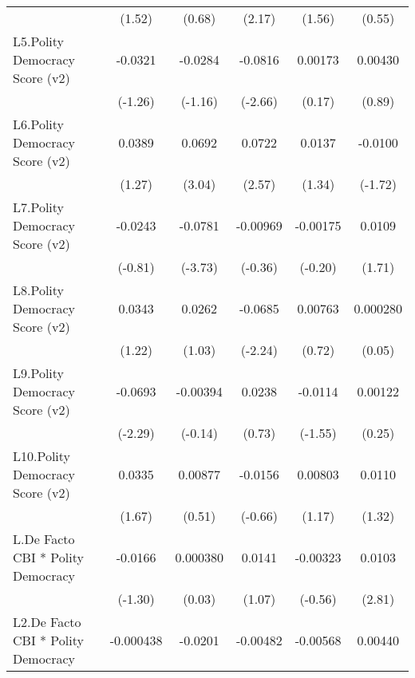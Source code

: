 {\begin{longtable}{l*{5}{c}}
                &   (1.52)         &   (0.68)         &   (2.17)         &   (1.56)         &   (0.55)         \\
[1em]
L5.Polity Democracy Score (v2)&  -0.0321         &  -0.0284         &  -0.0816\sym{**} &  0.00173         &  0.00430         \\
                &  (-1.26)         &  (-1.16)         &  (-2.66)         &   (0.17)         &   (0.89)         \\
[1em]
L6.Polity Democracy Score (v2)&   0.0389         &   0.0692\sym{**} &   0.0722\sym{*}  &   0.0137         &  -0.0100         \\
                &   (1.27)         &   (3.04)         &   (2.57)         &   (1.34)         &  (-1.72)         \\
[1em]
L7.Polity Democracy Score (v2)&  -0.0243         &  -0.0781\sym{***}& -0.00969         & -0.00175         &   0.0109         \\
                &  (-0.81)         &  (-3.73)         &  (-0.36)         &  (-0.20)         &   (1.71)         \\
[1em]
L8.Polity Democracy Score (v2)&   0.0343         &   0.0262         &  -0.0685\sym{*}  &  0.00763         & 0.000280         \\
                &   (1.22)         &   (1.03)         &  (-2.24)         &   (0.72)         &   (0.05)         \\
[1em]
L9.Polity Democracy Score (v2)&  -0.0693\sym{*}  & -0.00394         &   0.0238         &  -0.0114         &  0.00122         \\
                &  (-2.29)         &  (-0.14)         &   (0.73)         &  (-1.55)         &   (0.25)         \\
[1em]
L10.Polity Democracy Score (v2)&   0.0335         &  0.00877         &  -0.0156         &  0.00803         &   0.0110         \\
                &   (1.67)         &   (0.51)         &  (-0.66)         &   (1.17)         &   (1.32)         \\
[1em]
L.De Facto CBI * Polity Democracy&  -0.0166         & 0.000380         &   0.0141         & -0.00323         &   0.0103\sym{**} \\
                &  (-1.30)         &   (0.03)         &   (1.07)         &  (-0.56)         &   (2.81)         \\
[1em]
L2.De Facto CBI * Polity Democracy&-0.000438         &  -0.0201\sym{*}  & -0.00482         & -0.00568         &  0.00440         \\

\end{longtable}}
